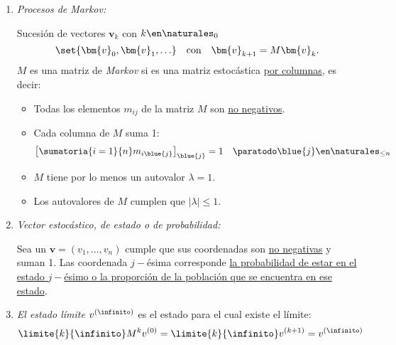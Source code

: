 \begin{enumerate}[label=\tiny\purple{\faIcon{snowman}}]
  \item\hypertarget{teoria-4:markov}{\textit{Procesos de Markov:}}

        Sucesión de vectores $\bm{v}_k$ con $k \en \naturales_0$
        $$
          \set{\bm{v}_0, \bm{v}_1, \ldots}
          \quad
          \text{con}
          \quad
          \bm{v}_{k+1} = M \bm{v}_k.
        $$
        $M$ es una matriz de \textit{Markov} si es una matriz estocástica \underline{por columnas}, es decir:
        \begin{itemize}
          \item Todas los elementos $m_{ij}$ de la matriz $M$ son \underline{no negativos}.

          \item Cada columna de $M$ suma 1:
                $$
                  \left[\sumatoria{i = 1}{n} m_{i\blue{j}}\right]_{\blue{j}} = 1
                  \quad
                  \paratodo \blue{j} \en \naturales_{\leq n}
                $$

          \item $M$ tiene por lo menos un autovalor $\lambda = 1$.

          \item Los autovalores de $M$ cumplen que $|\lambda| \leq 1$.
        \end{itemize}

  \item \textit{Vector estocástico, de estado o de probabilidad:}

        Sea un $\bm{v} = (v_1, \ldots, v_n)$ cumple que sus coordenadas son \underline{no negativas} y suman 1.
        Las coordenada $j-$ésima corresponde \ul{la probabilidad de estar en el estado $j-$ésimo o la proporción
          de la población que se encuentra en ese estado}.

  \item
        \textit{El estado límite $v^{(\infinito)}$} es el estado para el cual existe el límite:
        $$
          \limite{k}{\infinito} M^kv^{(0)} =
          \limite{k}{\infinito} v^{(k+1)} =  v^{(\infinito)}
        $$


\end{enumerate}
